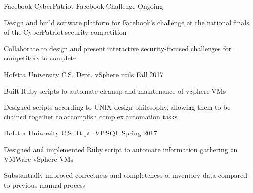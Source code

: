 \begin{cventries}


\cventry
    {Facebook} %
    {CyberPatriot Facebook Challenge} %
    {}
    {Ongoing}
    {
      \begin{cvitems}
      \item {Design and build software platform for Facebook's challenge at the national finals of the CyberPatriot security competition}
      \item {Collaborate to design and present interactive security-focused challenges for competitors to complete }
      \end{cvitems}
    }

\cventry    
  {Hofstra University C.S. Dept.} %
  {vSphere utils} %
  {}
  {Fall 2017}
  {
    \begin{cvitems} %
    \item {Built Ruby scripts to automate cleanup and maintenance of vSphere VMs}
    \item {Designed scripts according to UNIX design philosophy, allowing them to be chained together to accomplish complex automation tasks}
    \end{cvitems}
  }
   
\cventry
    {Hofstra University C.S. Dept.} %
    {VI2SQL} %
    {}
    {Spring 2017}
    {
      \begin{cvitems} %
        \item {Designed and implemented Ruby script to automate information gathering on VMWare vSphere VMs}
        \item {Substantially improved correctness and completeness of inventory data compared to previous manual process}
      \end{cvitems}
    }


\end{cventries}
